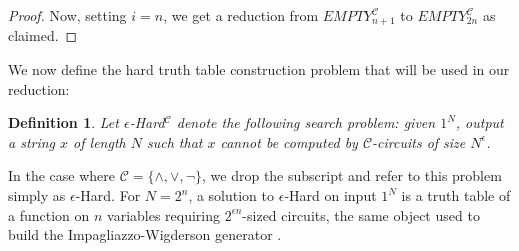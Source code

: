 \documentclass[11pt]{article}
\newtheorem{definition}{Definition}
\begin{document}
\begin{proof}
Now, setting $i = n$, we get a reduction from {\sc $EMPTY_{n+1}^{\mathcal{C}}$} to {\sc $EMPTY_{2n}^{\mathcal{C}}$} as claimed.

\end{proof}
We now define the hard truth table construction problem that will be used in our reduction:
\begin{definition}
Let {\sc $\epsilon$-Hard}$^{\mathcal{C}}$ denote the following search problem: given $1^N$, output a string $x$ of length $N$ such that $x$ cannot be computed by $\mathcal{C}$-circuits of size $N^\epsilon$.
\end{definition}
In the case where $\mathcal{C} =\{\land,\lor,\lnot\}$, we drop the subscript and refer to this problem simply as {\sc $\epsilon$-Hard}.
For $N = 2^n$, a solution to {\sc $\epsilon$-Hard} on input $1^N$ is a truth table of a function on $n$ variables requiring $2^{\epsilon n}$-sized circuits, the same object used to build the Impagliazzo-Wigderson generator \cite{IW}.
\end{document}

